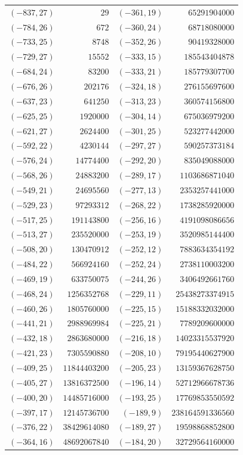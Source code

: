 \documentclass[11pt]{amsart}
\theoremstyle{definition}
\begin{document}
{\scriptsize\begin{tabular}{@{}r@{\ \ }r@{\qquad}r@{\ \ }r@{}}
$(-837,27)$ & $29$ & $(-361,19)$ & $65291904000$ \\
$(-784,26)$ & $672$ & $(-360,24)$ & $68718080000$ \\
$(-733,25)$ & $8748$ & $(-352,26)$ & $90419328000$ \\
$(-729,27)$ & $15552$ & $(-333,15)$ & $185543404878$ \\
$(-684,24)$ & $83200$ & $(-333,21)$ & $185779307700$ \\
$(-676,26)$ & $202176$ & $(-324,18)$ & $276155697600$ \\
$(-637,23)$ & $641250$ & $(-313,23)$ & $360574156800$ \\
$(-625,25)$ & $1920000$ & $(-304,14)$ & $675036979200$ \\
$(-621,27)$ & $2624400$ & $(-301,25)$ & $523277442000$ \\
$(-592,22)$ & $4230144$ & $(-297,27)$ & $590257373184$ \\
$(-576,24)$ & $14774400$ & $(-292,20)$ & $835049088000$ \\
$(-568,26)$ & $24883200$ & $(-289,17)$ & $1103686871040$ \\
$(-549,21)$ & $24695560$ & $(-277,13)$ & $2353257441000$ \\
$(-529,23)$ & $97293312$ & $(-268,22)$ & $1738285920000$ \\
$(-517,25)$ & $191143800$ & $(-256,16)$ & $4191098086656$ \\
$(-513,27)$ & $235520000$ & $(-253,19)$ & $3520985144400$ \\
$(-508,20)$ & $130470912$ & $(-252,12)$ & $7883634354192$ \\
$(-484,22)$ & $566924160$ & $(-252,24)$ & $2738110003200$ \\
$(-469,19)$ & $633750075$ & $(-244,26)$ & $3406492661760$ \\
$(-468,24)$ & $1256352768$ & $(-229,11)$ & $25438273374915$ \\
$(-460,26)$ & $1805760000$ & $(-225,15)$ & $15188332032000$ \\
$(-441,21)$ & $2988969984$ & $(-225,21)$ & $7789209600000$ \\
$(-432,18)$ & $2863680000$ & $(-216,18)$ & $14023315537920$ \\
$(-421,23)$ & $7305590880$ & $(-208,10)$ & $79195440627900$ \\
$(-409,25)$ & $11844403200$ & $(-205,23)$ & $13159367628750$ \\
$(-405,27)$ & $13816372500$ & $(-196,14)$ & $52712966678736$ \\
$(-400,20)$ & $14485716000$ & $(-193,25)$ & $17769853550592$ \\
$(-397,17)$ & $12145736700$ & $(-189,9)$ & $238164591336560$ \\
$(-376,22)$ & $38429614080$ & $(-189,27)$ & $19598868852800$ \\
$(-364,16)$ & $48692067840$ & $(-184,20)$ & $32729564160000$ \\
\end{tabular}}\par
\end{document}
